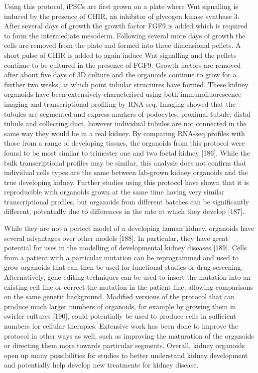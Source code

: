 \documentclass[11pt,a4paper,titlepage,twoside,openright]{style/unimelbthesis}
\theoremstyle{definition}
\theoremstyle{definition}
\theoremstyle{definition}
\theoremstyle{remark}
\begin{document}
\begin{mainmatter}
Using this protocol, iPSCs are first grown on a plate where Wnt signalling is induced by the presence of CHIR, an inhibitor of glycogen kinase synthase 3. After several days of growth the growth factor FGF9 is added which is required to form the intermediate mesoderm. Following several more days of growth the cells are removed from the plate and formed into three dimensional pellets. A short pulse of CHIR is added to again induce Wnt signalling and the pellets continue to be cultured in the presence of FGF9. Growth factors are removed after about five days of 3D culture and the organoids continue to grow for a further two weeks, at which point tubular structures have formed. These kidney organoids have been extensively characterised using both immunofluorescence imaging and transcriptional profiling by RNA-seq. Imaging showed that the tubules are segmented and express markers of podocytes, proximal tubule, distal tubule and collecting duct, however individual tubules are not connected in the same way they would be in a real kidney. By comparing RNA-seq profiles with those from a range of developing tissues, the organoids from this protocol were found to be most similar to trimester one and two foetal kidney {[}186{]}. While the bulk transcriptional profiles may be similar, this analysis does not confirm that individual cells types are the same between lab-grown kidney organoids and the true developing kidney. Further studies using this protocol have shown that it is reproducible with organoids grown at the same time having very similar transcriptional profiles, but organoids from different batches can be significantly different, potentially due to differences in the rate at which they develop {[}187{]}.

While they are not a perfect model of a developing human kidney, organoids have several advantages over other models {[}188{]}. In particular, they have great potential for uses in the modelling of developmental kidney diseases {[}189{]}. Cells from a patient with a particular mutation can be reprogrammed and used to grow organoids that can then be used for functional studies or drug screening. Alternatively, gene editing techniques can be used to insert the mutation into an existing cell line or correct the mutation in the patient line, allowing comparisons on the same genetic background. Modified versions of the protocol that can produce much larger numbers of organoids, for example by growing them in swirler cultures {[}190{]}, could potentially be used to produce cells in sufficient numbers for cellular therapies. Extensive work has been done to improve the protocol in other ways as well, such as improving the maturation of the organoids or directing them more towards particular segments. Overall, kidney organoids open up many possibilities for studies to better understand kidney development and potentially help develop new treatments for kidney disease.


\end{mainmatter}
\end{document}
